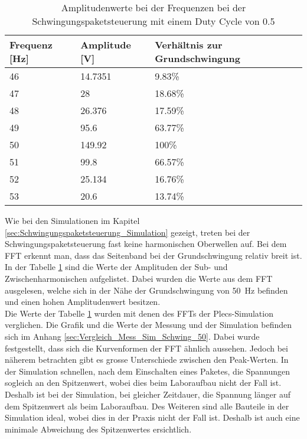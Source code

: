 \newpage
\begin{table}[ht!]
	\centering
	\begin{tabular}{|l|l|l|}
		\hline
		Frequenz {[}Hz{]} & Amplitude {[}V{]} & Verhältnis zur Grundschwingung \\ \hline
		46                & 14.7351           & 9.83\%                         \\ \hline
		47                & 28                & 18.68\%                        \\ \hline
		48                & 26.376            & 17.59\%                        \\ \hline
		49                & 95.6              & 63.77\%                        \\ \hline
		50                & 149.92            & 100\%                          \\ \hline
		51                & 99.8              & 66.57\%                        \\ \hline
		52                & 25.134            & 16.76\%                        \\ \hline
		53                & 20.6              & 13.74\%                        \\ \hline
	\end{tabular}
\caption{Amplitudenwerte bei der Frequenzen bei der Schwingungspaketsteuerung mit einem Duty Cycle von 0.5}\label{tab:Mess_Spannung_Schwing_50}
\end{table}

Wie bei den Simulationen im Kapitel \ref{sec:Schwingungspaketsteuerung_Simulation} gezeigt, treten bei der Schwingungspaketsteuerung fast keine harmonischen Oberwellen auf. Bei dem FFT erkennt man, dass das Seitenband bei der Grundschwingung relativ breit ist. In der Tabelle \ref{tab:Mess_Spannung_Schwing_50} sind die Werte der Amplituden der Sub- und Zwischenharmonischen aufgelistet. Dabei wurden die Werte aus dem FFT ausgelesen, welche sich in der Nähe der Grundschwingung von \SI{50}{Hz} befinden und einen hohen Amplitudenwert besitzen. \\
Die Werte der Tabelle \ref{tab:Mess_Spannung_Schwing_50} wurden mit denen des FFTs der Plecs-Simulation verglichen. Die Grafik und die Werte der Messung und der Simulation befinden sich im Anhang \ref{sec:Vergleich_Mess_Sim_Schwing_50}. Dabei wurde festgestellt, dass sich die Kurvenformen der FFT ähnlich aussehen. Jedoch bei näherem betrachten gibt es grosse Unterschiede zwischen den Peak-Werten. In der Simulation schnellen, nach dem Einschalten eines Paketes, die Spannungen sogleich an den Spitzenwert, wobei dies beim Laboraufbau nicht der Fall ist. Deshalb ist bei der Simulation, bei gleicher Zeitdauer, die Spannung länger auf dem Spitzenwert als beim Laboraufbau. Des Weiteren sind alle Bauteile in der Simulation ideal, wobei dies in der Praxis nicht der Fall ist. Deshalb ist auch eine minimale Abweichung des Spitzenwertes ersichtlich.



